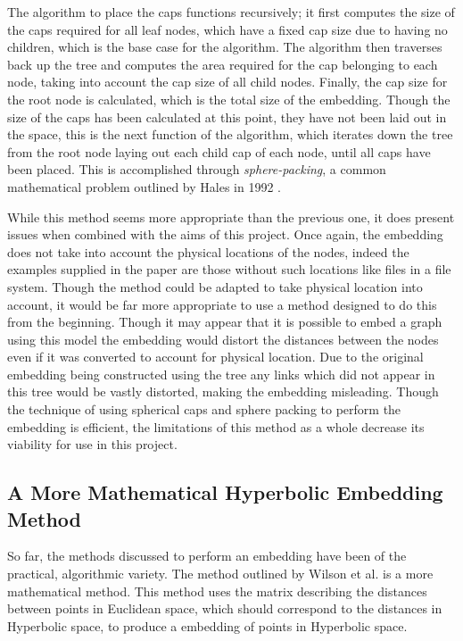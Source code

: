 The algorithm to place the caps functions recursively; it first computes the size of the caps required for all leaf nodes, which have a fixed cap size due to having no children, which is the base case for the algorithm. The algorithm then traverses back up the tree and computes the area required for the cap belonging to each node, taking into account the cap size of all child nodes. Finally, the cap size for the root node is calculated, which is the total size of the embedding. Though the size of the caps has been calculated at this point, they have not been laid out in the space, this is the next function of the algorithm, which iterates down the tree from the root node laying out each child cap of each node, until all caps have been placed. This is accomplished through \textit{sphere-packing}, a common mathematical problem outlined by Hales in 1992 \cite{hales_sphere_1992}.

While this method seems more appropriate than the previous one, it does present issues when combined with the aims of this project. Once again, the embedding does not take into account the physical locations of the nodes, indeed the examples supplied in the paper are those without such locations like files in a file system. Though the method could be adapted to take physical location into account, it would be far more appropriate to use a method designed to do this from the beginning. Though it may appear that it is possible to embed a graph using this model the embedding would distort the distances between the nodes even if it was converted to account for physical location. Due to the original embedding being constructed using the tree any links which did not appear in this tree would be vastly distorted, making the embedding misleading. Though the technique of using spherical caps and sphere packing to perform the embedding is efficient, the limitations of this method as a whole decrease its viability for use in this project.

\subsection{A More Mathematical Hyperbolic Embedding Method}

So far, the methods discussed to perform an embedding have been of the practical, algorithmic variety. The method outlined by Wilson et al. \cite{wilson_spherical_2014} is a more mathematical method. This method uses the matrix describing the distances between points in Euclidean space, which should correspond to the distances in Hyperbolic space, to produce a embedding of points in Hyperbolic space.

